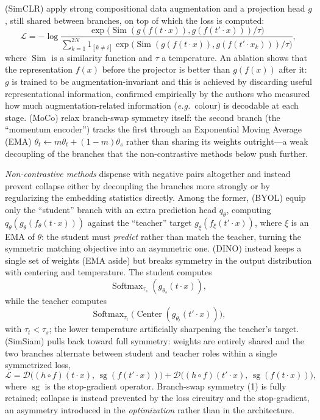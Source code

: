 \documentclass[mathematics,review,submit,moreauthors]{Definitions/mdpi}
\begin{document}
\citet{chen2020p3icml} (SimCLR) apply strong compositional data augmentation and a projection head $g$, still shared between branches, on top of which the loss is computed:
\begin{equation}
    \mathcal{L}=-\log\frac{\exp\big(\operatorname{Sim}(g(f(t\cdot x)),g(f(t'\cdot x)))/\tau\big)}{\sum_{k=1}^{2N} 1_{[k\neq i]}\exp\big(\operatorname{Sim}(g(f(t\cdot x)),g(f(t'\cdot x_k)))/\tau\big)},
\end{equation}
where $\operatorname{Sim}$ is a similarity function and $\tau$ a temperature.
An ablation shows that the representation $f(x)$ before the projector is better than $g(f(x))$ after it: $g$ is trained to be augmentation-invariant and this is achieved by discarding useful representational information, confirmed empirically by the authors who measured how much augmentation-related information (\textit{e.g.}\ colour) is decodable at each stage.
\citet{he2020} (MoCo) relax branch-swap symmetry itself: the second branch (the ``momentum encoder'') tracks the first through an Exponential Moving Average (EMA) $\theta_t\leftarrow m\theta_t+(1-m)\theta_s$ rather than sharing its weights outright---a weak decoupling of the branches that the non-contrastive methods below push further.

\emph{Non-contrastive methods} dispense with negative pairs altogether and instead prevent collapse either by decoupling the branches more strongly or by regularizing the embedding statistics directly.
Among the former, \citet{grill2020} (BYOL) equip only the ``student'' branch with an extra prediction head $q_\theta$, computing $q_\theta(g_\theta(f_\theta(t\cdot x)))$ against the ``teacher'' target $g_\xi(f_\xi(t'\cdot x))$, where $\xi$ is an EMA of $\theta$: the student must \emph{predict} rather than match the teacher, turning the symmetric matching objective into an asymmetric one.
\citet{caron2021} (DINO) instead keeps a single set of weights (EMA aside) but breaks symmetry in the output distribution with centering and temperature.
The student computes
\[
    \operatorname{Softmax}_{\tau_s}(g_{\theta_s}(t\cdot x)),
\]
while the teacher computes
\[
    \operatorname{Softmax}_{\tau_t}
    \bigl(\operatorname{Center}(g_{\theta_t}(t'\cdot x))\bigr),
\]
with $\tau_t<\tau_s$; the lower temperature artificially sharpening the teacher's target.
\citet{chen2020a} (SimSiam) pulls back toward full symmetry: weights are entirely shared and the two branches alternate between student and teacher roles within a single symmetrized loss,
$$
\mathcal{L}=\mathcal{D}\big((h\circ f)(t\cdot x),\,\operatorname{sg}(f(t'\cdot x))\big)+\mathcal{D}\big((h\circ f)(t'\cdot x),\,\operatorname{sg}(f(t\cdot x))\big),
$$
where $\operatorname{sg}$ is the stop-gradient operator.
Branch-swap symmetry (1) is fully retained; collapse is instead prevented by the loss circuitry and the stop-gradient, an asymmetry introduced in the \emph{optimization} rather than in the architecture.
\end{document}
